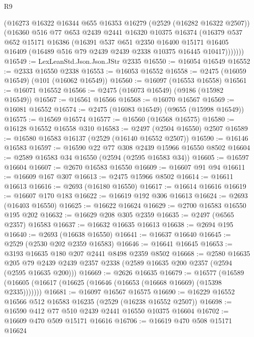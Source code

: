 \begin{lexlean}{R9}
\begin{coremodule}
        (@16273
          @16322
          @16344
          @655
          @16353
          @16279
          (@2529 (@16282 @16322 @2507))
          (@16360
            @516
            @77
            @653
            @2439
            @2441
            @16320
            @10375
            @16374
            (@16379
              @537
              @652
              @15171
              @16386
              (@16391
                @537
                @651
                @2350
                @16400
                @15171
                @16405
                @16409
                (@16489 @516 @79 @2439 @2439 @2338 @10375 @16445 @10417)))))))
@16549 := LexLeanStd.Json.Json.JStr @2335
@16550 := @16054 @16549
@16552 := @2333 @16550 @2338
@16553 := @16053 @16552
@16558 := @2475 (@16059 @16549) (@101 (@16062 @16549))
@16560 := @16097 (@16553 @16558)
@16561 := @16071 @16552
@16566 := @2475 (@16073 @16549) (@9186 (@15982 @16549))
@16567 := @16561 @16566
@16568 := @16070 @16567
@16569 := @16081 @16552
@16574 := @2475 (@16083 @16549) (@9655 (@15998 @16549))
@16575 := @16569 @16574
@16577 := @16560 (@16568 @16575)
@16580 := @16128 @16552 @16558 @310
@16583 := @2497 (@2504 @16550) @2507
@16589 := @16580 @16583 @16137 (@2529 (@16140 @16552 @2507))
@16590 := @16146 @16583
@16597 := @16590 @22 @77 @308 @2439 @15966 @16550 @8502
@16604 := @2589 @16583 @34 @16550 (@2594 (@2595 @16583 @34))
@16605 := @16597 @16604
@16607 := @2670 @16583 @16550
@16609 := @16607 @91 @94
@16611 := @16609 @167 @307
@16613 := @2475 @15966 @8502
@16614 := @16611 @16613
@16616 := @2693 (@16180 @16550)
@16617 := @16614 @16616
@16619 := @16607 @170 @183
@16622 := @16619 @192 @306 @16613
@16624 := @2693 (@16403 @16550)
@16625 := @16622 @16624
@16629 := @2700 @16583 @16550 @195 @202
@16632 := @16629 @208 @305 @2359
@16635 := @2497 (@6565 @2357) @16583
@16637 := @16632 @16635 @16613
@16638 := @2694 @195
@16640 := @2693 (@16638 @16550)
@16641 := @16637 @16640
@16645 := @2529 (@2530 @202 @2359 @16583)
@16646 := @16641 @16645
@16653 := @3193 @16635 @180 @207 @2441 @8498 @2359 @8502
@16668 := @2580
    @16635
    @205
    @79
    @2439
    @2439
    @2357
    @2338
    (@2589 @16635 @200 @2357 (@2594 (@2595 @16635 @200)))
@16669 := @2626 @16635
@16679 := @16577
    (@16589 (@16605 (@16617 (@16625 (@16646 (@16653 (@16668 @16669) (@15398 @2335)))))))
@16681 := @16097 @16567 @16575
@16690 := @16229 @16552 @16566 @512 @16583 @16235 (@2529 (@16238 @16552 @2507))
@16698 := @16590 @412 @77 @510 @2439 @2441 @16550 @10375 @16604
@16702 := @16609 @470 @509 @15171 @16616
@16706 := @16619 @470 @508 @15171 @16624

\end{coremodule}
\end{lexlean}
